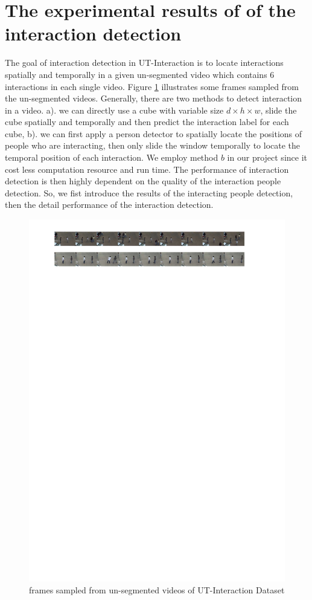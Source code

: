 \section{The experimental results of of the interaction detection}
The goal of interaction detection in UT-Interaction is to locate interactions spatially and temporally in a given un-segmented video which contains 6 interactions in each single video. Figure \ref{fig:unseg_v} illustrates some frames sampled from the un-segmented videos. Generally, there are two methods to detect interaction in a video. a). we can directly use a cube with variable size \(d \times h \times w\), slide the cube spatially and temporally and then predict the interaction label for each cube, b). we can first apply a person detector to spatially locate the positions of people who are interacting, then only slide the window temporally to locate the temporal position of each interaction. We employ method \(b\) in our project since it cost less computation resource and run time. The performance of interaction detection is then highly dependent on the quality of  the interaction people detection. So, we fist introduce the results of the interacting people detection, then the detail performance of the interaction detection.     

\begin{figure}
	\includegraphics[trim=2cm 25.5cm 0cm 1cm]{fig01/det_v.pdf}
	\caption{frames sampled from un-segmented videos of UT-Interaction Dataset}
	\label{fig:unseg_v}
\end{figure}

